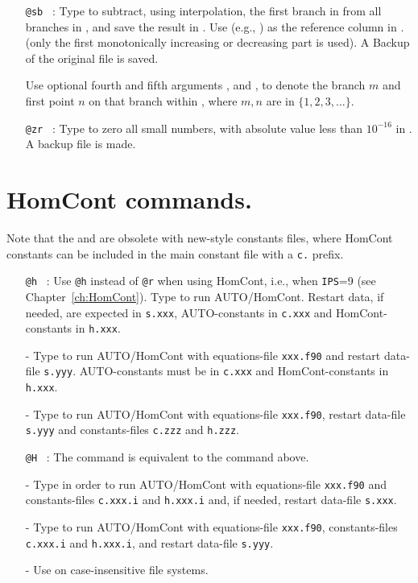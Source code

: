 \documentclass[12pt]{report}
\begin{document}
\begin{itemize}
\item[\tt @sb]~:
  Type  to subtract, using interpolation, the first
  branch in  from all branches in ,
  and save the result in .
  Use  (e.g., ) as the reference
  column in .
  (only the first monotonically increasing or decreasing part is used).
  A Backup of the original file is saved.

  Use optional fourth and fifth arguments , and
  , to denote the
  branch $m$ and first point $n$ on that branch within ,
  where $m,n$ are in $\{1,2,3,\ldots\}$.

\item[\tt @zr]~:
  Type  to zero all small numbers, with absolute
  value less than $10^{-16}$ in . A backup file is made.

\end{itemize}

\section{ HomCont commands.} 

Note that the  and  are obsolete with
new-style constants files, where HomCont constants can be included in
the main constant file with a {\tt c.} prefix.
\begin{itemize}
\item[\tt @h]~:
  Use {\tt @h} instead of {\tt @r} when using {\cal HomCont}, i.e., when {\tt IPS}=9
  (see Chapter~\ref{ch:HomCont}).
  Type  to run {\cal AUTO}/{\cal HomCont}.
  Restart data, if needed, are expected in {\tt s.xxx},
  {\cal AUTO}-constants in {\tt c.xxx} and {\cal HomCont}-constants in {\tt h.xxx}.
\item[-]
  Type  to run {\cal AUTO}/{\cal HomCont}
  with equations-file {\tt xxx.f90} and restart data-file {\tt s.yyy}.
  {\cal AUTO}-constants must be in {\tt c.xxx} and {\cal HomCont}-constants in {\tt h.xxx}.
\item[-]
  Type  to run {\cal AUTO}/{\cal HomCont}
  with equations-file {\tt xxx.f90}, restart data-file {\tt s.yyy}
  and constants-files {\tt c.zzz} and {\tt h.zzz}.

\item[\tt @H]~:
  The command  is equivalent to the command  above.
\item[-]
  Type  in order to run {\cal AUTO}/{\cal HomCont} with equations-file {\tt xxx.f90}
  and constants-files {\tt c.xxx.i} and {\tt h.xxx.i}
  and, if needed, restart data-file {\tt s.xxx}. 
\item[-]
  Type  to run {\cal AUTO}/{\cal HomCont}
  with equations-file {\tt xxx.f90}, 
  constants-files {\tt c.xxx.i} and {\tt h.xxx.i},
  and restart data-file {\tt s.yyy}.
\item[-]
  Use  on case-insensitive file systems.
\end{itemize}
\end{document}
